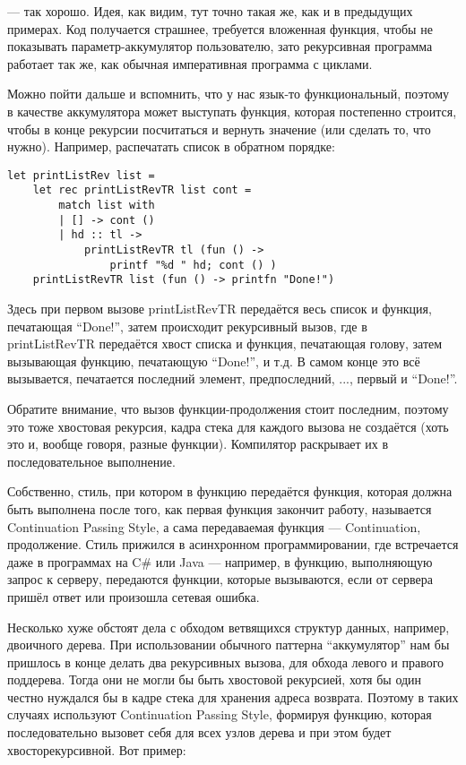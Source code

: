 \documentclass[a5paper]{article}
\begin{document}
--- так хорошо. Идея, как видим, тут точно такая же, как и в предыдущих примерах. Код получается страшнее, требуется вложенная функция, чтобы не показывать параметр-аккумулятор пользователю, зато рекурсивная программа работает так же, как обычная императивная программа с циклами.

Можно пойти дальше и вспомнить, что у нас язык-то функциональный, поэтому в качестве аккумулятора может выступать функция, которая постепенно строится, чтобы в конце рекурсии посчитаться и вернуть значение (или сделать то, что нужно). Например, распечатать список в обратном порядке:

\begin{verbatim}
let printListRev list =
    let rec printListRevTR list cont =
        match list with
        | [] -> cont ()
        | hd :: tl ->
            printListRevTR tl (fun () -> 
                printf "%d " hd; cont () )
    printListRevTR list (fun () -> printfn "Done!")
\end{verbatim}

Здесь при первом вызове printListRevTR передаётся весь список и функция, печатающая ``Done!'', затем происходит рекурсивный вызов, где в printListRevTR передаётся хвост списка и функция, печатающая голову, затем вызывающая функцию, печатающую ``Done!'', и т.д. В самом конце это всё вызывается, печатается последний элемент, предпоследний, ..., первый и ``Done!''.

Обратите внимание, что вызов функции-продолжения стоит последним, поэтому это тоже хвостовая рекурсия, кадра стека для каждого вызова не создаётся (хоть это и, вообще говоря, разные функции). Компилятор раскрывает их в последовательное выполнение.

Собственно, стиль, при котором в функцию передаётся функция, которая должна быть выполнена после того, как первая функция закончит работу, называется Continuation Passing Style, а сама передаваемая функция --- Continuation, продолжение. Стиль прижился в асинхронном программировании, где встречается даже в программах на C\# или Java --- например, в функцию, выполняющую запрос к серверу, передаются функции, которые вызываются, если от сервера пришёл ответ или произошла сетевая ошибка.

Несколько хуже обстоят дела с обходом ветвящихся структур данных, например, двоичного дерева. При использовании обычного паттерна ``аккумулятор'' нам бы пришлось в конце делать два рекурсивных вызова, для обхода левого и правого поддерева. Тогда они не могли бы быть хвостовой рекурсией, хотя бы один честно нуждался бы в кадре стека для хранения адреса возврата. Поэтому в таких случаях используют Continuation Passing Style, формируя функцию, которая последовательно вызовет себя для всех узлов дерева и при этом будет хвосторекурсивной. Вот пример:
\end{document}
